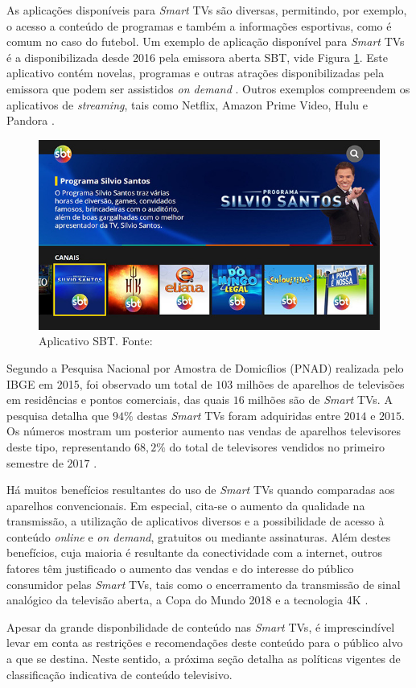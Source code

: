 As aplicações disponíveis para \emph{Smart} TVs são diversas, permitindo, por exemplo, o acesso a conteúdo de programas e também a informações esportivas, como é comum no caso do futebol. Um exemplo de aplicação disponível para \emph{Smart} TVs é a disponibilizada desde 2016 pela emissora aberta SBT, vide Figura \ref{fig:sbt_app}. Este aplicativo contém novelas, programas e outras atrações disponibilizadas pela emissora que podem ser assistidos \emph{on demand} \cite{sbt:tvconectada}. Outros exemplos compreendem os aplicativos de \emph{streaming}, tais como Netflix, Amazon Prime Video, Hulu e Pandora \cite{canaltech:streaming}.

\begin{figure}[h!]
	\centering
	\includegraphics[width=\textwidth]{img/sbt_app.jpg}
	\caption{Aplicativo SBT. Fonte: \cite{sbt:tvconectada}}
	\label{fig:sbt_app}
\end{figure}

Segundo a Pesquisa Nacional por Amostra de Domicílios (PNAD) realizada pelo IBGE em 2015, foi observado um total de $103$ milhões de aparelhos de televisões em residências e pontos comerciais, das quais $16$ milhões são de \emph{Smart} TVs. A pesquisa detalha que $94\%$ destas \emph{Smart} TVs foram adquiridas entre $2014$ e $2015$. Os números mostram um posterior aumento nas vendas de aparelhos televisores deste tipo, representando $68,2\%$ do total de televisores vendidos no primeiro semestre de $2017$ \cite{pnad2015}.

Há muitos benefícios resultantes do uso de \emph{Smart} TVs quando comparadas aos aparelhos convencionais. Em especial, cita-se o aumento da qualidade na transmissão, a utilização de aplicativos diversos e a possibilidade de acesso à conteúdo \emph{online} e \emph{on demand}, gratuitos ou mediante assinaturas. Além destes benefícios, cuja maioria é resultante da conectividade com a internet, outros fatores têm justificado o aumento das vendas e do interesse do público consumidor pelas \emph{Smart} TVs, tais como o encerramento da transmissão de sinal analógico da televisão aberta, a Copa do Mundo 2018 e a tecnologia 4K \cite{leiajabuscasmart,correiopnad,estadao:explosaovideosonline}.

Apesar da grande disponbilidade de conteúdo nas \emph{Smart} TVs, é imprescindível levar em conta as restrições e recomendações deste conteúdo para o público alvo a que se destina. Neste sentido, a próxima seção detalha as políticas vigentes de classificação indicativa de conteúdo televisivo.
